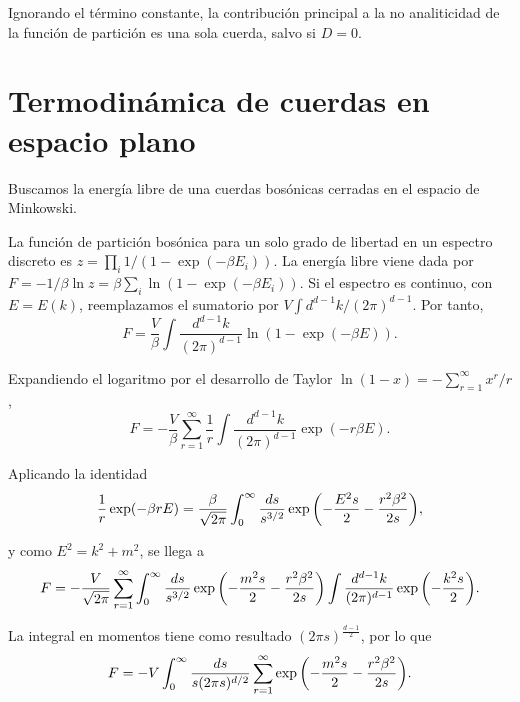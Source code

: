 Ignorando el término constante, la contribución principal a la no analiticidad de la función de partición es una sola cuerda, salvo si $D=0$.

\section{Termodinámica de cuerdas en espacio plano}

Buscamos la energía libre de una cuerdas bosónicas cerradas en el espacio de Minkowski.

La función de partición bosónica para un solo grado de libertad en un espectro discreto es $z=\prod_i 1/(1-\exp(-\beta E_i))$.
La energía libre viene dada por $F=-1/\beta \ln z=\beta\sum_i \ln(1-\exp(-\beta E_i))$.
Si el espectro es continuo, con $E=E(k)$, reemplazamos el sumatorio por $V\int d^{d-1}k/(2\pi)^{d-1}$. Por tanto,
\begin{equation}
  F=\frac{V}{\beta}\int \frac{d^{d-1}k}{(2\pi)^{d-1}}\ln(1-\exp(-\beta E)).
\end{equation}

Expandiendo el logaritmo por el desarrollo de Taylor $\ln(1-x)=-\sum^\infty_{r=1} x^r/r$,
\begin{equation}
  F=-\frac{V}{\beta}\sum^\infty_{r=1} \frac 1 r\int \frac{d^{d-1}k}{(2\pi)^{d-1}}\exp(-r\beta E).
\end{equation}

Aplicando la identidad
\begin{equation}
  \frac 1 r \exp(-\beta r E)=\frac{\beta}{\sqrt{2\pi}}\int_0^\infty \frac{ds}{s^{3/2}}\exp\qty(-\frac{E^2s}{2}-\frac{r^2\beta^2}{2s}),
\end{equation}

y como $E^2=k^2+m^2$, se llega a 
\begin{equation}
  F=-\frac{V}{\sqrt{2\pi}}\sum^\infty_{r=1} \int_0^\infty \frac{ds}{s^{3/2}} \exp \qty(-\frac{m^2s}{2} -\frac{r^2\beta^2}{2s})
  \int \frac{d^{d-1}k}{(2\pi)^{d-1}}\exp\qty(-\frac{k^2s}{2}).
\end{equation}

La integral en momentos tiene como resultado $(2\pi s)^{\frac{d-1}{2}}$, por lo que
\begin{equation}
  F=-V \int_0^\infty \frac{ds}{s(2\pi s)^{d/2}}\sum^\infty_{r=1} \exp \qty(-\frac{m^2s}{2}- \frac{r^2\beta^2}{2s}).
\end{equation}

